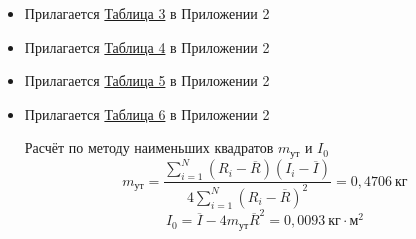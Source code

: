 \begin{itemize}
    \item Прилагается \hyperlink{table3}{Таблица 3} в Приложении 2
    \item Прилагается \hyperlink{table4}{Таблица 4} в Приложении 2
    \item Прилагается \hyperlink{table5}{Таблица 5} в Приложении 2
    \item Прилагается \hyperlink{table6}{Таблица 6} в Приложении 2

    Расчёт по методу наименьших квадратов $m_\text{ут}$ и $I_0$ \\
    \[
        m_\text{ут} = \frac{\sum_{i=1}^{N} \left( R_i - \overline{R} \right) \left( I_i - \overline{I} \right)}{4\sum_{i=1}^{N} \left( R_i - \overline{R} \right)^2} = 0,4706 \ \text{кг}
    \]
    \[
        I_0 = \overline{I} - 4m_{\text{ут}}\overline{R}^2 = 0,0093 \ \text{кг} \cdot \text{м}^2
    \]
\end{itemize}